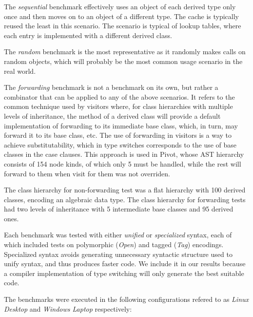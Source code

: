 The \emph{sequential} benchmark effectively uses an object of each derived type only 
once and then moves on to an object of a different type. The cache is typically 
reused the least in this scenario. The scenario is typical of lookup tables, 
where each entry is implemented with a different derived class.

The \emph{random} benchmark is the most representative as it randomly makes calls on 
random objects, which will probably be the most common usage scenario in the 
real world.

The \emph{forwarding} benchmark is not a benchmark on its own, but rather a 
combinator that can be applied to any of the above scenarios. It refers to the 
common technique used by visitors where, for class hierarchies with multiple 
levels of inheritance, the  method of a derived class will provide a 
default implementation of forwarding to its immediate base class, which, in turn, 
may forward it to its base class, etc. The use of forwarding in visitors is a 
way to achieve substitutability, which in type switches corresponds to the use 
of base classes in the case clauses.
This approach is used in Pivot, whose AST 
hierarchy consists of 154 node kinds, of which only 5 must be handled, while the 
rest will forward to them when visit for them was not overriden.

The class hierarchy for non-forwarding test was a flat hierarchy with 100 
derived classes, encoding an algebraic data type. The class hierarchy for 
forwarding tests had two levels of inheritance with 5 intermediate base classes 
and 95 derived ones. 

Each benchmark was tested with either \emph{unified} or \emph{specialized} 
syntax, each of which included tests on polymorphic (\emph{Open}) and tagged 
(\emph{Tag}) encodings. Specialized syntax avoids generating unnecessary 
syntactic structure used to unify syntax, and thus produces faster code. We 
include it in our results because a compiler implementation of type switching 
will only generate the best suitable code.

The benchmarks were executed in the following configurations refered to as 
\emph{Linux Desktop} and \emph{Windows Laptop} respectively:

